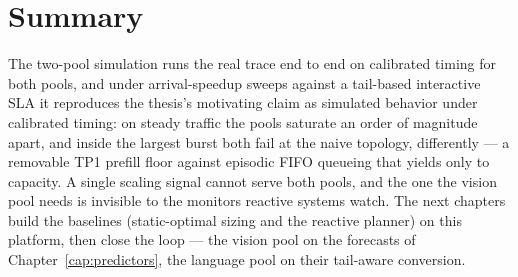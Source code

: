 \section{Summary}

The two-pool simulation runs the real trace end to end on calibrated
timing for both pools, and under arrival-speedup sweeps against a tail-based
interactive SLA it reproduces the thesis's motivating claim as simulated
behavior under calibrated timing:
on steady traffic the pools saturate an order of magnitude apart, and
inside the largest burst both fail at the naive topology, differently
--- a removable TP1 prefill floor against episodic FIFO queueing that
yields only to capacity. A single scaling signal cannot serve both
pools, and the one the vision pool needs is invisible to the monitors
reactive systems watch. The next chapters build the baselines
(static-optimal sizing and the reactive planner) on this platform, then
close the loop --- the vision pool on the forecasts of
Chapter~\ref{cap:predictors}, the language pool on their tail-aware
conversion.
